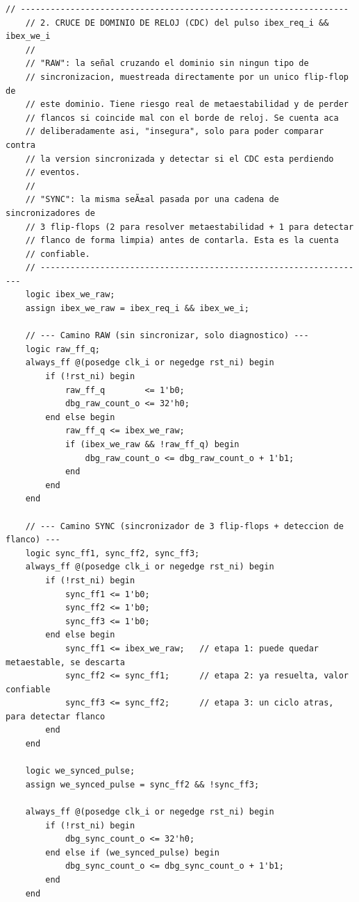 \begin{lstlisting}[style=verilogstyle, basicstyle=\ttfamily\footnotesize, caption={Código fuente del subsistema \texttt{reporter\_core.sv}}, label={code:reporter_core.sv}]
    // ------------------------------------------------------------------
    // 2. CRUCE DE DOMINIO DE RELOJ (CDC) del pulso ibex_req_i && ibex_we_i
    //
    // "RAW": la señal cruzando el dominio sin ningun tipo de
    // sincronizacion, muestreada directamente por un unico flip-flop de
    // este dominio. Tiene riesgo real de metaestabilidad y de perder
    // flancos si coincide mal con el borde de reloj. Se cuenta aca
    // deliberadamente asi, "insegura", solo para poder comparar contra
    // la version sincronizada y detectar si el CDC esta perdiendo
    // eventos.
    //
    // "SYNC": la misma seÃ±al pasada por una cadena de sincronizadores de
    // 3 flip-flops (2 para resolver metaestabilidad + 1 para detectar
    // flanco de forma limpia) antes de contarla. Esta es la cuenta
    // confiable.
    // ------------------------------------------------------------------
    logic ibex_we_raw;
    assign ibex_we_raw = ibex_req_i && ibex_we_i;

    // --- Camino RAW (sin sincronizar, solo diagnostico) ---
    logic raw_ff_q;
    always_ff @(posedge clk_i or negedge rst_ni) begin
        if (!rst_ni) begin
            raw_ff_q        <= 1'b0;
            dbg_raw_count_o <= 32'h0;
        end else begin
            raw_ff_q <= ibex_we_raw;
            if (ibex_we_raw && !raw_ff_q) begin
                dbg_raw_count_o <= dbg_raw_count_o + 1'b1;
            end
        end
    end

    // --- Camino SYNC (sincronizador de 3 flip-flops + deteccion de flanco) ---
    logic sync_ff1, sync_ff2, sync_ff3;
    always_ff @(posedge clk_i or negedge rst_ni) begin
        if (!rst_ni) begin
            sync_ff1 <= 1'b0;
            sync_ff2 <= 1'b0;
            sync_ff3 <= 1'b0;
        end else begin
            sync_ff1 <= ibex_we_raw;   // etapa 1: puede quedar metaestable, se descarta
            sync_ff2 <= sync_ff1;      // etapa 2: ya resuelta, valor confiable
            sync_ff3 <= sync_ff2;      // etapa 3: un ciclo atras, para detectar flanco
        end
    end

    logic we_synced_pulse;
    assign we_synced_pulse = sync_ff2 && !sync_ff3;

    always_ff @(posedge clk_i or negedge rst_ni) begin
        if (!rst_ni) begin
            dbg_sync_count_o <= 32'h0;
        end else if (we_synced_pulse) begin
            dbg_sync_count_o <= dbg_sync_count_o + 1'b1;
        end
    end


\end{lstlisting}

